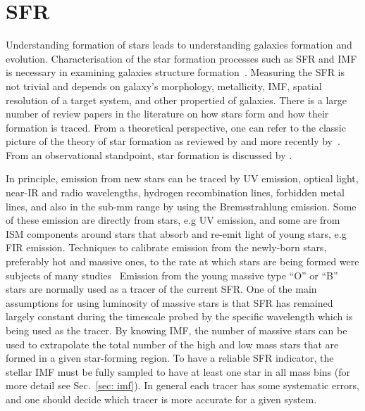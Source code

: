 
\section{SFR}
\label{sec: sfr_intro}
Understanding formation of stars leads to understanding galaxies formation and evolution. 
Characterisation of the star formation processes such as SFR and IMF is necessary in examining galaxies structure formation~\citep{McKee07}. 
Measuring the SFR is not trivial and depends on galaxy's morphology, metallicity, IMF, spatial resolution of a target system, and other propertied of galaxies. 
There is a large number of review papers in the literature on how stars form and how their formation is traced. 
From a theoretical perspective, one can refer to the classic picture of the theory of star formation as reviewed by \cite{Shu87} and more recently by~\citep{McKee07}. 
From an observational standpoint, star formation is discussed by \cite[][and references therein]{Kennicutt98b, Kewley02, Calzetti13, Boquien10, Kennicutt12}.

In principle, emission from new stars can be traced by UV emission, optical light, near-IR and radio wavelengths, hydrogen recombination lines, forbidden metal lines, and also in the sub-mm range by using the Bremsstrahlung emission. 
Some of these emission are directly from stars, e.g UV emission, and some are from ISM components around stars that absorb and re-emit light of young stars, e.g FIR emission.
Techniques to calibrate emission from the newly-born stars, preferably hot and massive ones, to the rate at which stars are being formed were subjects of many studies~\citep[e.g.][]{Calzetti07, Kennicutt11, Hao11,Bigiel08} 
Emission from the young massive type ``O'' or ``B'' stars are normally used as a tracer of the current SFR.
One of the main assumptions for using luminosity of massive stars is that SFR has remained largely constant during the timescale probed by the specific wavelength which is being used as the tracer. 
By knowing IMF, the number of massive stars can be used to extrapolate the total number of the high and low mass stars that are formed in a given star-forming region.
To have a reliable SFR indicator, the stellar IMF must be fully sampled to have at least one star in all mass bins (for more detail see Sec.~\ref{sec: imf}).
In general each tracer has some systematic errors, and one should decide which tracer is more accurate for a given system. 

